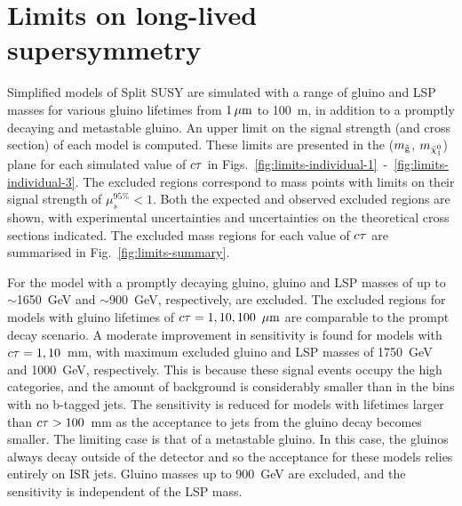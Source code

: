 \section{Limits on long-lived supersymmetry}
\label{sec:results-limits}
Simplified models of Split SUSY are simulated with a range of gluino and LSP 
masses for various gluino lifetimes from $1\,{\mu}\text{m}$ to 100~m, in addition to a 
promptly decaying and metastable gluino. An upper limit on the signal strength 
(and cross section) of each model is computed. These limits are presented in 
the ($m_{\mathrm{\tilde{g}}}$, $m_{\tilde{\chi}_1^0}$) plane for each simulated value of $c\tau$ in 
Figs.~\ref{fig:limits-individual-1}~-~\ref{fig:limits-individual-3}.
The excluded regions correspond to mass points with limits on their signal 
strength of $\mu_s^{95\%} < 1$. 
Both the expected and observed excluded regions are shown, with experimental 
uncertainties and uncertainties on the theoretical cross sections indicated. 
The excluded mass regions for each value of $c\tau$ are summarised in 
Fig.~\ref{fig:limits-summary}.


For the model with a promptly decaying gluino, gluino and LSP masses of up to 
$\sim$1650~GeV and $\sim$900~GeV, respectively, are excluded. The excluded 
regions for models with gluino lifetimes of $c\tau = 1, 10, 100~\,{\mu}\text{m}$ are 
comparable to the prompt decay scenario. 
A moderate improvement in sensitivity is found for models with $c\tau = 1, 
10$~mm, with maximum excluded gluino and LSP masses of 1750~GeV and 1000~GeV, 
respectively. This is because these signal events occupy the high \nb 
categories, and the amount of background is considerably smaller than in the 
bins with no b-tagged jets. 
The sensitivity is reduced for models with lifetimes larger than $c\tau > 
100$~mm as the acceptance to jets from the gluino decay becomes smaller. The 
limiting case is that of a metastable gluino. In this case, the gluinos always 
decay outside of the detector and so the acceptance for these models relies 
entirely on ISR jets. Gluino masses up to 900~GeV are excluded, and the 
sensitivity is independent of the LSP mass.


